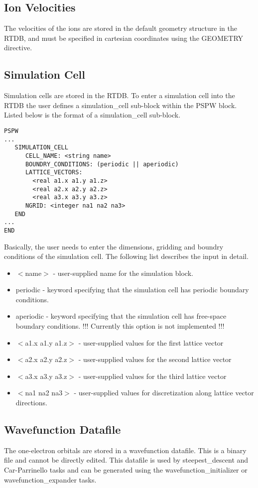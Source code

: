 \subsection{Ion Velocities}
The velocities of the ions are stored in the default geometry structure
in the RTDB, and must be specified in cartesian 
coordinates using the GEOMETRY directive.

\subsection{Simulation Cell}
Simulation cells are stored in the RTDB.  To enter a  simulation cell
into the RTDB the user defines a simulation\_cell sub-block within the PSPW 
block.  Listed below is the format of a simulation\_cell sub-block.
\begin{verbatim}
PSPW
...
   SIMULATION_CELL
      CELL_NAME: <string name>
      BOUNDRY_CONDITIONS: (periodic || aperiodic)
      LATTICE_VECTORS:
        <real a1.x a1.y a1.z>
        <real a2.x a2.y a2.z>
        <real a3.x a3.y a3.z>
      NGRID: <integer na1 na2 na3>
   END
...
END
\end{verbatim}
Basically, the user needs to enter the dimensions, gridding and boundry
conditions of the simulation cell.  The following list describes the 
input in detail.
\begin{itemize}
	\item $<$name$>$ - user-supplied name for the simulation block.
	\item periodic - keyword specifying that the simulation cell 
	                 has periodic boundary conditions. 	
	\item aperiodic - keyword specifying that the simulation cell
		          has free-space boundary conditions. !!! Currently 
			  this option is not implemented !!!
	\item $<$a1.x a1.y a1.z$>$ - user-supplied values for the first 
				   lattice vector 
	\item $<$a2.x a2.y a2.z$>$ - user-supplied values for the second 
				   lattice vector
	\item $<$a3.x a3.y a3.z$>$ - user-supplied values for the third 
				   lattice vector
	\item $<$na1 na2 na3$>$ - user-supplied values for discretization 
				along lattice vector directions.
\end{itemize}

\subsection{Wavefunction Datafile}
The one-electron orbitals are stored in a wavefunction datafile.  This
is a binary file and cannot be directly edited.  This datafile is used
by steepest\_descent and Car-Parrinello tasks and can be generated
using the wavefunction\_initializer or wavefunction\_expander tasks.

